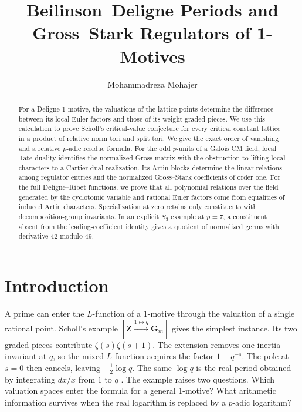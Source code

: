 \documentclass[11pt]{amsart}
\title[Special values and regulator relations of 1-motives]
{Beilinson--Deligne Periods and Gross--Stark Regulators of 1-Motives}
\author{Mohammadreza Mohajer}
\numberwithin{equation}{section}
\theoremstyle{definition}
\theoremstyle{remark}
\newcommand{\Z}{\mathbf Z}
\newcommand{\Gm}{\mathbf G_m}
\begin{document}
\begin{abstract}
For a Deligne 1-motive, the valuations of the lattice points
determine the difference between its local Euler factors and those
of its weight-graded pieces. We use this calculation to prove
Scholl's critical-value conjecture for every critical constant
lattice in a product of relative norm tori and split tori. We give
the exact order of vanishing and a relative $p$-adic residue formula.
For the odd $p$-units of a Galois CM field, local Tate duality
identifies the normalized Gross matrix with the obstruction to
lifting local characters to a Cartier-dual realization. Its Artin
blocks determine the linear relations among regulator entries and
the normalized Gross--Stark coefficients of order one. For the
full Deligne--Ribet functions, we prove that all polynomial
relations over the field generated by the cyclotomic variable and
rational Euler factors come from equalities of induced Artin
characters. Specialization at zero retains only constituents with
decomposition-group invariants. In an explicit $S_3$ example at
$p=7$, a constituent absent from the leading-coefficient identity gives
a quotient of normalized germs with derivative $42$ modulo $49$.
\end{abstract}

\maketitle
\setcounter{tocdepth}{1}
\tableofcontents
\clearpage

\section{Introduction}

A prime can enter the $L$-function of a 1-motive through the
valuation of a single rational point. Scholl's example
$[\Z\xrightarrow{1\mapsto q}\Gm]$ gives the simplest instance.
Its two graded pieces contribute $\zeta(s)\zeta(s+1)$. The
extension removes one inertia invariant at $q$, so the mixed
$L$-function acquires the factor $1-q^{-s}$. The pole at $s=0$
then cancels, leaving $-\tfrac12\log q$. The same $\log q$ is
the real period obtained by integrating $dx/x$ from $1$ to $q$
\cite[\S II]{Scholl}. The example raises two questions. Which
valuation spaces enter the formula for a general 1-motive? What
arithmetic information survives when the real logarithm is replaced
by a $p$-adic logarithm?
\end{document}
